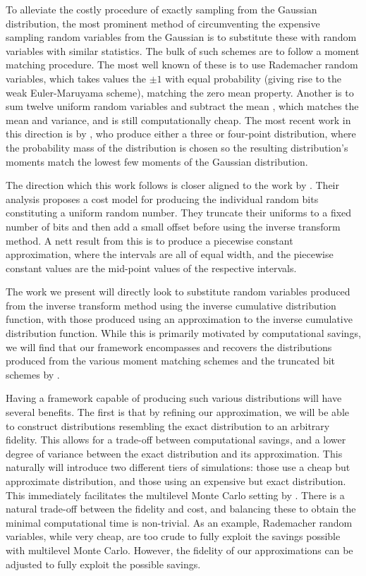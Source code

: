 \documentclass[manuscript,review]{acmart}
\begin{document}
To alleviate the costly procedure of exactly sampling from the Gaussian distribution, the most prominent method of circumventing the expensive sampling random variables from the Gaussian is to substitute these with random variables with similar statistics. The bulk of such schemes are to follow a moment matching procedure. The most well known of these is to use Rademacher random variables, which takes values the $ \pm 1 $ with equal probability \citep[page~XXXII]{kloeden1999numerical} (giving rise to the weak Euler-Maruyama scheme), matching the zero mean property. Another is to sum twelve uniform random variables and subtract the mean \citep[page~500]{munk2011fixed}, which matches the mean and variance, and is still computationally cheap. The most recent work in this direction is by \citet{muller2015improving}, who produce either a three or four-point distribution, where the probability mass of the distribution is chosen so the resulting distribution's moments match the lowest few moments of the Gaussian distribution. 

The direction which this work follows is closer aligned to the work by \citet{giles2019random_quadrature,giles2019random_multilevel}. Their analysis proposes a cost model for producing the individual random bits constituting a uniform random number. They truncate their uniforms to a fixed number of bits and then add a small offset before using the inverse transform method. A nett result from this is to produce a piecewise constant approximation, where the intervals are all of equal width, and the piecewise constant values are the mid-point values of the respective intervals. 

The work we present will directly look to substitute random variables produced from the inverse transform method using the inverse cumulative distribution function, with those produced using an approximation to the inverse cumulative distribution function. While this is primarily motivated by computational savings, we will find that our framework encompasses and recovers the distributions produced from the various moment matching schemes and the truncated bit schemes by \citet{giles2019random_quadrature,giles2019random_multilevel}. 

Having a framework capable of producing such various distributions will have several benefits. The first is that by refining our approximation, we will be able to construct distributions resembling the exact distribution to an arbitrary fidelity. This allows for a trade-off between computational savings, and a lower degree of variance between the exact distribution and its approximation. This naturally will introduce two different tiers of simulations: those use a cheap but approximate distribution, and those using an expensive but exact distribution. This immediately facilitates the multilevel Monte Carlo setting by \citet{giles2008multilevel}. There is a natural trade-off between the fidelity and cost, and balancing these to obtain the minimal computational time is non-trivial. As an example, Rademacher random variables, while very cheap, are too crude to fully exploit the savings possible with multilevel Monte Carlo. However, the fidelity of our approximations can be adjusted to fully exploit the possible savings. 
\end{document}
